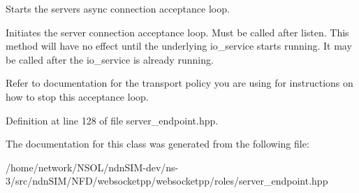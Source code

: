 Starts the server\textquotesingle{}s async connection acceptance loop. 

Initiates the server connection acceptance loop. Must be called after listen. This method will have no effect until the underlying io\+\_\+service starts running. It may be called after the io\+\_\+service is already running.

Refer to documentation for the transport policy you are using for instructions on how to stop this acceptance loop. 

Definition at line 128 of file server\+\_\+endpoint.\+hpp.



The documentation for this class was generated from the following file\+:\begin{DoxyCompactItemize}
\item 
/home/network/\+N\+S\+O\+L/ndn\+S\+I\+M-\/dev/ns-\/3/src/ndn\+S\+I\+M/\+N\+F\+D/websocketpp/websocketpp/roles/server\+\_\+endpoint.\+hpp\end{DoxyCompactItemize}
